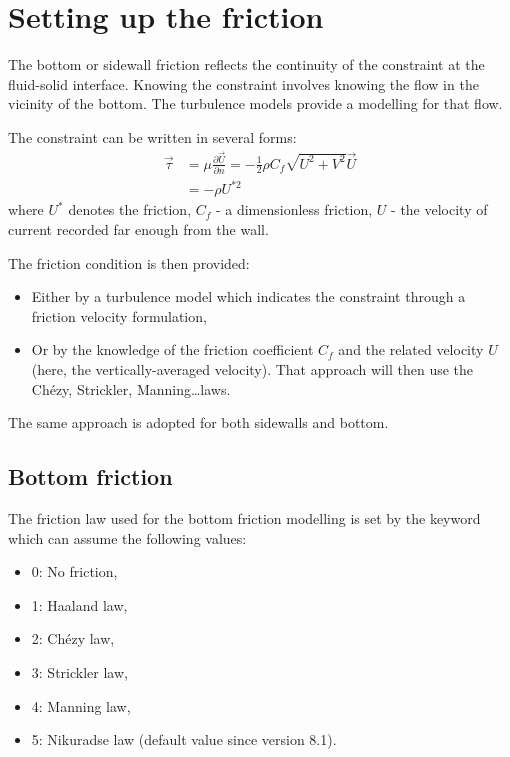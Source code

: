 \section{Setting up the friction}

The bottom or sidewall friction reflects the continuity of the constraint at
the fluid-solid interface. Knowing the constraint involves knowing the flow in
the vicinity of the bottom. The turbulence models provide a modelling for that
flow.

The constraint can be written in several forms:
\begin{align}
\vec{\tau } & = \mu \frac{\partial \vec{U}}{\partial n}
            = -\frac{1}{2} \rho C_{f} \sqrt{U^{2} +V^{2} } \vec{U}\\
            & = -\rho U^{*2}
\end{align}
where $U^{*}$ denotes the friction, $C_{f}$ - a dimensionless friction, $U$ -
the velocity of current recorded far enough from the wall.

The friction condition is then provided:

\begin{itemize}
\item  Either by a turbulence model which indicates the constraint through a
friction velocity formulation,

\item  Or by the knowledge of the friction coefficient $C_{f}$ and the related
velocity $U$ (here, the vertically-averaged velocity). That approach will then
use the Chézy, Strickler, Manning\dots  laws.
\end{itemize}

The same approach is adopted for both sidewalls and bottom.


\subsection{Bottom friction}

The friction law used for the bottom friction modelling is set by the keyword
 which can assume the following values:

\begin{itemize}
\item  0: No friction,

\item  1: Haaland law,

\item  2: Chézy law,

\item  3: Strickler law,

\item  4: Manning law,

\item  5: Nikuradse law (default value since version 8.1).
\end{itemize}

